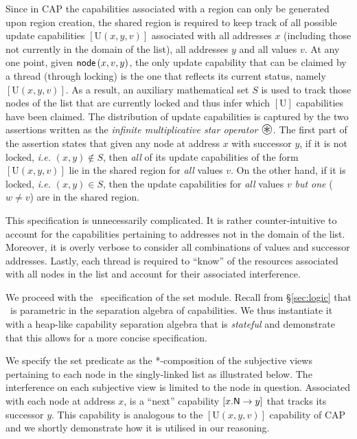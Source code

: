 Since in CAP the capabilities associated with a region can only be generated upon region creation, the shared region is required to keep track of all possible update capabilities $[\text{U}(x, y, v)]$ associated with all addresses $x$ (including those not currently in the domain of the list), all addresses $y$ and all values $v$. At any one point, given $\textsf{node}\left(x, v, y\right)$, the only update capability that can be claimed by a thread (through locking) is the one that reflects its current status, namely $[\text{U}(x, y, v)]$. As a result, an auxiliary mathematical set $S$ is used to track those nodes of the list that are currently locked and thus infer which $[\text{U}]$ capabilities have been claimed. The distribution of update capabilities is captured by the two assertions written as the \emph{infinite multiplicative star operator} $\iterStar$. The first part of the assertion states that given any node at address $x$ with successor $y$, if it is not locked, \textit{i.e.} $(x, y) \not\in S$, then \emph{all} of its update capabilities of the form $[\text{U}(x, y, v)]$ lie in the shared region for \emph{all} values $v$. On the other hand, if it is locked, \textit{i.e.} $(x, y) \in S$, then the update capabilities for \emph{all} values $v$ \emph{but one} ($w \not= v$) are in the shared region.

This specification is unnecessarily complicated. It is rather counter-intuitive to account for the capabilities pertaining to addresses not in the domain of the list. Moreover, it is overly verbose to consider all combinations of values and successor addresses. Lastly, each thread is required to ``know'' of the resources associated with all nodes in the list and account for their associated interference. 

%
We proceed with the \colosl\ specification of the set module. Recall from \S\ref{sec:logic} that \colosl\ is parametric in the separation algebra of capabilities. We thus instantiate it with a heap-like capability separation algebra that is \emph{stateful} and demonstrate that this allows for a more concise specification.  

We specify the set predicate as the *-composition of the subjective views pertaining to each node in the singly-linked list as illustrated below. The interference on each subjective view is limited to the node in question. Associated with each node at address $x$, is a ``next'' capability $\nextC{x}{y}$ that tracks its successor $y$. This capability is analogous to the $[\text{U}(x, y, v)]$ capability of CAP and we shortly demonstrate how it is utilised in our reasoning.

